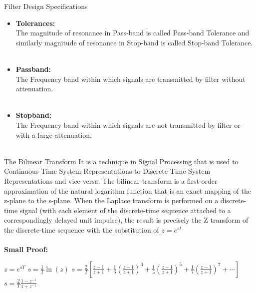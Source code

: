 \documentclass{beamer}
\begin{document}
\begin{frame}{Filter Design Specifications}
\begin{itemize}
    \item \textbf{Tolerances:}\\
The magnitude of resonance in Pass-band is called Pass-band Tolerance and
similarly magnitude of resonance in Stop-band is called Stop-band Tolerance.\\~\\
\item \textbf{Passband:}\\
The Frequency band within which signals are transmitted by filter without
attenuation.\\~\\

\item \textbf{Stopband:}\\
The Frequency band within which signals are not transmitted by filter or with a large attenuation.\\~\\
\end{itemize}
\end{frame}
\begin{frame}{The Bilinear Transform}
    \smallskip \hspace{2ex} It is a technique in Signal Processing that is used to Continuous-Time System
Representations to Discrete-Time System Representations and vice-versa. The bilinear transform is a first-order approximation of the natural logarithm function that is an exact mapping of the z-plane to the s-plane. When the Laplace transform is performed on a discrete-time signal (with each element of the discrete-time sequence attached to a correspondingly delayed unit impulse), the result is precisely the $\mathrm{Z}$ transform of the discrete-time sequence with the substitution of $z=e^{s t}$\\~\\
\textbf{Small Proof:}

$z=e^{s T}$
$s=\frac{1}{T} \ln (z)$
$s=\frac{2}{T}\left[\frac{z-1}{z+1}+\frac{1}{3}\left(\frac{z-1}{z+1}\right)^{3}+\frac{1}{5}\left(\frac{z-1}{z+1}\right)^{5}+\frac{1}{7}\left(\frac{z-1}{z+1}\right)^{7}+\cdots\right]$
$s=\frac{2}{T} \frac{1-z^{-1}}{1+z^{-1}}$
\end{frame}
\end{document}
